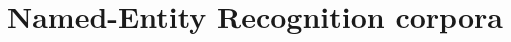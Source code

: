 \documentclass{mimosis}
\begin{document}
\chapter{Named-Entity Recognition corpora}


\backmatter

\begingroup
\let\clearpage\relax
\glsaddall
\printglossary[type=\acronymtype]
\newpage
\printglossary
\endgroup

\printindex



\end{document}
